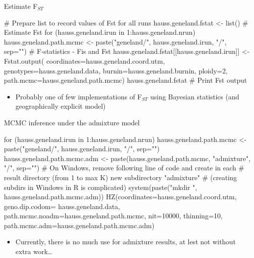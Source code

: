 \documentclass[compress, ucs, xelatex, 11pt, xcolor=svgnames, aspectratio=169,
	hyperref={
		bookmarks=true,
		unicode=true,
		colorlinks=true,
		pdftitle={Molecular data in R},
		plainpages=false,
		pdfauthor={Vojtech Zeisek},
		pdfsubject={Course about phylogeny and evolution in R},
		pdfcreator={XeLaTeX},
		pdfkeywords={R, evolution, phylogeny, molecular data},
		linkcolor=Crimson, %
		anchorcolor=Magenta, %
		citecolor=Magenta, %
		filecolor=Magenta, %
		menucolor=Magenta, %
		urlcolor=DodgerBlue, %
		pdftex},
	url={hyphens, lowtilde} %
	]{beamer}
\begin{document}
\begin{frame}[fragile]{Estimate F$_{ST}$}
	\begin{spluscode}
    # Prepare list to record values of Fst for all runs
    hauss.geneland.fstat <- list()
    # Estimate Fst
    for (hauss.geneland.irun in 1:hauss.geneland.nrun) {
      hauss.geneland.path.mcmc <- paste("geneland/",
      hauss.geneland.irun, "/", sep="")
      # F-statistics - Fis and Fst
      hauss.geneland.fstat[[hauss.geneland.irun]] <- Fstat.output(
        coordinates=hauss.geneland.coord.utm,
        genotypes=hauss.geneland.data,
        burnin=hauss.geneland.burnin, ploidy=2,
        path.mcmc=hauss.geneland.path.mcmc)
      }
    hauss.geneland.fstat # Print Fst output
	\end{spluscode}
	\begin{itemize}
	\item Probably one of few implementations of F$_{ST}$ using Bayesian statistics (and geographically explicit model)
	\end{itemize}
\end{frame}

\begin{frame}[fragile]{MCMC inference under the admixture model}
	\begin{spluscode}
    for (hauss.geneland.irun in 1:hauss.geneland.nrun) {
      hauss.geneland.path.mcmc <- paste("geneland/",
        hauss.geneland.irun, "/", sep="")
      hauss.geneland.path.mcmc.adm <- paste(hauss.geneland.path.mcmc,
        "admixture", "/", sep="")
      # On Windows, remove following line of code and create in each
      # result directory (from 1 to max K) new subdirectory "admixture"
      # (creating subdirs in Windows in R is complicated)
      system(paste("mkdir ", hauss.geneland.path.mcmc.adm))
      HZ(coordinates=hauss.geneland.coord.utm, geno.dip.codom=
        hauss.geneland.data, path.mcmc.noadm=hauss.geneland.path.mcmc,
        nit=10000, thinning=10,
        path.mcmc.adm=hauss.geneland.path.mcmc.adm)
      }
	\end{spluscode}
	\begin{itemize}
		\item Currently, there is no much use for admixture results, at lest not without extra work\ldots
	\end{itemize}
\end{frame}
\end{document}
